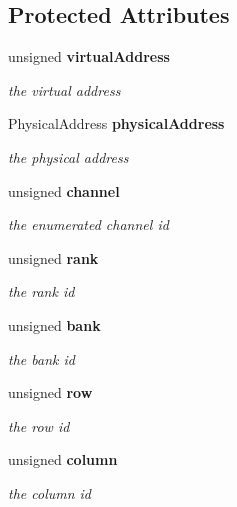 \subsection*{Protected Attributes}
\begin{CompactItemize}
\item 
unsigned {\bf virtualAddress}\label{class_d_r_a_msim_i_i_1_1_address_c666d19c4bb12632573fd0088e96cce4}

\begin{CompactList}\small\item\em the virtual address \item\end{CompactList}\item 
PhysicalAddress {\bf physicalAddress}\label{class_d_r_a_msim_i_i_1_1_address_17b1f2891afb1c6427595f7386f8fd48}

\begin{CompactList}\small\item\em the physical address \item\end{CompactList}\item 
unsigned {\bf channel}\label{class_d_r_a_msim_i_i_1_1_address_8fb5de009ae35aa5eb9ad6e8d80195b8}

\begin{CompactList}\small\item\em the enumerated channel id \item\end{CompactList}\item 
unsigned {\bf rank}\label{class_d_r_a_msim_i_i_1_1_address_5da1fcbe9eb7e47322ff435b02e47a70}

\begin{CompactList}\small\item\em the rank id \item\end{CompactList}\item 
unsigned {\bf bank}\label{class_d_r_a_msim_i_i_1_1_address_ec81009e3aa060a1f81a686dead86b3d}

\begin{CompactList}\small\item\em the bank id \item\end{CompactList}\item 
unsigned {\bf row}\label{class_d_r_a_msim_i_i_1_1_address_c5b4121363ce1d2d5a88ff829d6ecc84}

\begin{CompactList}\small\item\em the row id \item\end{CompactList}\item 
unsigned {\bf column}\label{class_d_r_a_msim_i_i_1_1_address_68b6537f0906082c17eb906f4dbf1a4b}

\begin{CompactList}\small\item\em the column id \item\end{CompactList}\end{CompactItemize}
